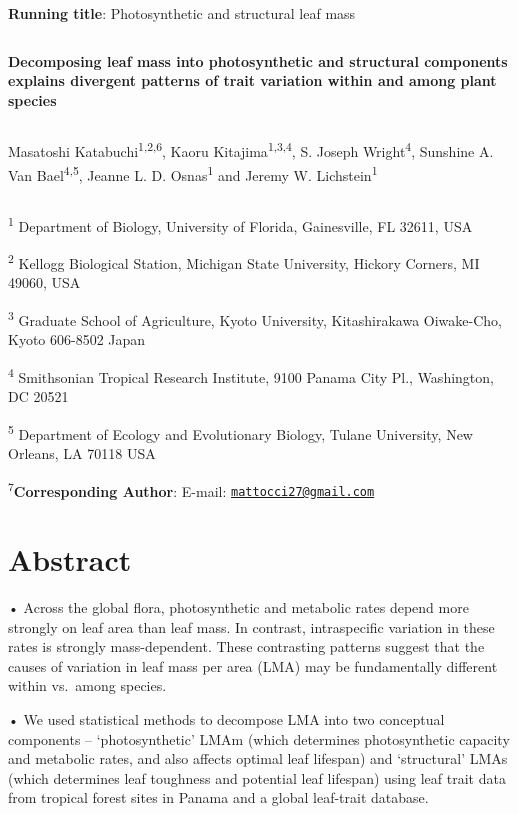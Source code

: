 \documentclass[12pt,]{article}
\title{}
\author{}
\date{}
\let\oldsubparagraph\subparagraph
\renewcommand{\subparagraph}[1]{\oldsubparagraph{#1}\mbox{}}
\theoremstyle{definition}
\theoremstyle{definition}
\theoremstyle{definition}
\theoremstyle{remark}
\begin{document}
\textbf{Running title}: Photosynthetic and structural leaf mass

\[ \]

\textbf{Decomposing leaf mass into photosynthetic and structural
components explains divergent patterns of trait variation within and
among plant species}

\[ \]

Masatoshi Katabuchi\textsuperscript{1,2,6}, Kaoru
Kitajima\textsuperscript{1,3,4}, S. Joseph Wright\textsuperscript{4},
Sunshine A. Van Bael\textsuperscript{4,5}, Jeanne L. D.
Osnas\textsuperscript{1} and Jeremy W. Lichstein\textsuperscript{1}

\[ \]

\textsuperscript{1} Department of Biology, University of Florida,
Gainesville, FL 32611, USA

\textsuperscript{2} Kellogg Biological Station, Michigan State
University, Hickory Corners, MI 49060, USA

\textsuperscript{3} Graduate School of Agriculture, Kyoto University,
Kitashirakawa Oiwake-Cho, Kyoto 606-8502 Japan

\textsuperscript{4} Smithsonian Tropical Research Institute, 9100 Panama
City Pl., Washington, DC 20521

\textsuperscript{5} Department of Ecology and Evolutionary Biology,
Tulane University, New Orleans, LA 70118 USA

\textsuperscript{7}\textbf{Corresponding Author}: E-mail:
\href{mailto:mattocci27@gmail.com}{\nolinkurl{mattocci27@gmail.com}}

\hypertarget{section}{%
\subparagraph{}\label{section}}

\hypertarget{abstract}{%
\section{Abstract}\label{abstract}}

• Across the global flora, photosynthetic and metabolic rates depend
more strongly on leaf area than leaf mass. In contrast, intraspecific
variation in these rates is strongly mass-dependent. These contrasting
patterns suggest that the causes of variation in leaf mass per area
(LMA) may be fundamentally different within vs.~among species.

• We used statistical methods to decompose LMA into two conceptual
components -- `photosynthetic' LMAm (which determines photosynthetic
capacity and metabolic rates, and also affects optimal leaf lifespan)
and `structural' LMAs (which determines leaf toughness and potential
leaf lifespan) using leaf trait data from tropical forest sites in
Panama and a global leaf-trait database.
\end{document}
